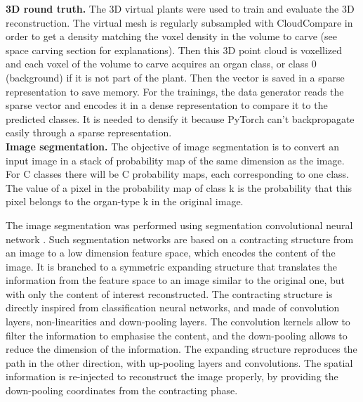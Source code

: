 \textbf{3D round truth.} The 3D virtual plants were used to train and evaluate the 3D reconstruction. The virtual mesh is regularly subsampled with CloudCompare \cite{girardeau-montaut_cloudcompare-open_2011} in order to get a density matching the voxel density in the volume to carve (see space carving section for explanations). Then this 3D point cloud is voxellized and each voxel of the volume to carve acquires an organ class, or class 0 (background) if it is not part of the plant. Then the vector is saved in a sparse representation to save memory. For the trainings, the data generator reads the sparse vector and encodes it in a dense representation to compare it to the predicted classes. It is needed to densify it because PyTorch can't backpropagate easily through a sparse representation.\\


\textbf{Image segmentation.} The objective of image segmentation is to convert an input image in a stack of probability map of the same dimension as the image. For C classes there will be C probability maps, each corresponding to one class. The value of a pixel in the probability map of class k is the probability that this pixel belongs to the organ-type k in the original image.


The image segmentation was performed using segmentation convolutional neural network \cite{guo_review_2018}. Such segmentation networks are based on a contracting structure from an image to a low dimension feature space, which encodes the content of the image. It is branched to a symmetric expanding structure that translates the information from the feature space to an image similar to the original one, but with only the content of interest reconstructed. The contracting structure is directly inspired from classification neural networks, and made of convolution layers, non-linearities and down-pooling layers. The convolution kernels allow to filter the information to emphasise the content, and the down-pooling allows to reduce the dimension of the information. The expanding structure reproduces the path in the other direction, with up-pooling layers and convolutions. The spatial information is re-injected to reconstruct the image properly, by providing the down-pooling coordinates from the contracting phase.

